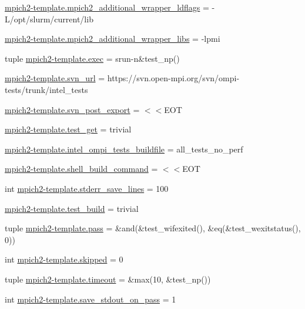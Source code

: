 \begin{DoxyCompactItemize}
\item 
\hyperlink{namespacempich2-template_ae2865f33a6b3ae966c6e7b785d0553b5}{mpich2-\/template.\-mpich2\-\_\-additional\-\_\-wrapper\-\_\-ldflags} = -\/L/opt/slurm/current/lib
\item 
\hyperlink{namespacempich2-template_a93955bb1c58ee54b6ec759ce3ec7ab05}{mpich2-\/template.\-mpich2\-\_\-additional\-\_\-wrapper\-\_\-libs} = -\/lpmi
\item 
tuple \hyperlink{namespacempich2-template_a3e54d8824fc59af417917b87182bdeb7}{mpich2-\/template.\-exec} = srun-\/n\&test\-\_\-np()
\item 
\hyperlink{namespacempich2-template_a4951a49f371e925195481dc34a166a0a}{mpich2-\/template.\-svn\-\_\-url} = https\-://svn.\-open-\/mpi.\-org/svn/ompi-\/tests/trunk/intel\-\_\-tests
\item 
\hyperlink{namespacempich2-template_a8bdb132d6863e51986a00ebae55adabd}{mpich2-\/template.\-svn\-\_\-post\-\_\-export} = $<$$<$E\-O\-T
\item 
\hyperlink{namespacempich2-template_abf3c50e4ed6bd38b7845e7aa1d9b4a67}{mpich2-\/template.\-test\-\_\-get} = trivial
\item 
\hyperlink{namespacempich2-template_addb99c522a88e9f52ea85bfbb54d50be}{mpich2-\/template.\-intel\-\_\-ompi\-\_\-tests\-\_\-buildfile} = all\-\_\-tests\-\_\-no\-\_\-perf
\item 
\hyperlink{namespacempich2-template_a79f63031d3664a486ed5bab613e4468f}{mpich2-\/template.\-shell\-\_\-build\-\_\-command} = $<$$<$E\-O\-T
\item 
int \hyperlink{namespacempich2-template_a4526a47057dcced7297a2eb36bc0f73c}{mpich2-\/template.\-stderr\-\_\-save\-\_\-lines} = 100
\item 
\hyperlink{namespacempich2-template_a74bcc1b555e44b4c152e7a6cba7bdd41}{mpich2-\/template.\-test\-\_\-build} = trivial
\item 
tuple \hyperlink{namespacempich2-template_ac6c94e8a4a76923d3a3720603dfaa59f}{mpich2-\/template.\-pass} = \&and(\&test\-\_\-wifexited(), \&eq(\&test\-\_\-wexitstatus(), 0))
\item 
int \hyperlink{namespacempich2-template_a082338bf19ff413c63167b2cf16d7cc2}{mpich2-\/template.\-skipped} = 0
\item 
tuple \hyperlink{namespacempich2-template_a59c507b362aba1d2422478a441eb13bc}{mpich2-\/template.\-timeout} = \&max(10, \&test\-\_\-np())
\item 
int \hyperlink{namespacempich2-template_ab8e41d30a18bb21a628c48447ef357a8}{mpich2-\/template.\-save\-\_\-stdout\-\_\-on\-\_\-pass} = 1

\end{DoxyCompactItemize}
